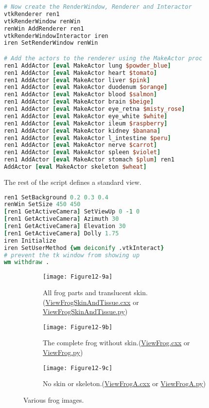 \begin{lstlisting}[language=TCL, caption={Create the actors.}]
# Now create the RenderWindow, Renderer and Interactor
vtkRenderer ren1
vtkRenderWindow renWin
renWin AddRenderer ren1
vtkRenderWindowInteractor iren
iren SetRenderWindow renWin

# Add the actors to the renderer using the MakeActor proc
ren1 AddActor [eval MakeActor lung $powder_blue]
ren1 AddActor [eval MakeActor heart $tomato]
ren1 AddActor [eval MakeActor liver $pink]
ren1 AddActor [eval MakeActor duodenum $orange]
ren1 AddActor [eval MakeActor blood $salmon]
ren1 AddActor [eval MakeActor brain $beige]
ren1 AddActor [eval MakeActor eye_retna $misty_rose]
ren1 AddActor [eval MakeActor eye_white $white]
ren1 AddActor [eval MakeActor ileum $raspberry]
ren1 AddActor [eval MakeActor kidney $banana]
ren1 AddActor [eval MakeActor l_intestine $peru]
ren1 AddActor [eval MakeActor nerve $carrot]
ren1 AddActor [eval MakeActor spleen $violet]
ren1 AddActor [eval MakeActor stomach $plum] ren1
AddActor [eval MakeActor skeleton $wheat]
\end{lstlisting}

The rest of the script defines a standard view.

\begin{lstlisting}[language=TCL, caption={Create the view.}]
ren1 SetBackground 0.2 0.3 0.4
renWin SetSize 450 450
[ren1 GetActiveCamera] SetViewUp 0 -1 0
[ren1 GetActiveCamera] Azimuth 30
[ren1 GetActiveCamera] Elevation 30
[ren1 GetActiveCamera] Dolly 1.75
iren Initialize
iren SetUserMethod {wm deiconify .vtkInteract}
# prevent the tk window from showing up
wm withdraw .
\end{lstlisting}

\begin{figure}[htb]
	\begin{subfigure}[h]{0.48\linewidth}
		\texttt{[image: Figure12-9a]}
		\caption{All frog parts and translucent skin.(\href{https://lorensen.github.io/VTKExamples/site/Cxx/Visualization/ViewFrogSkinAndTissue}{ViewFrogSkinAndTissue.cxx} or \href{https://lorensen.github.io/VTKExamples/site/Python/Visualization/ViewFrogSkinAndTissue/}{ViewFrogSkinAndTissue.py})}\label{fig:Figure12-9a}
	\end{subfigure}
	\hfill
	\begin{subfigure}[h]{0.48\linewidth}
		\texttt{[image: Figure12-9b]}
		\caption{The complete frog without skin.(\href{https://lorensen.github.io/VTKExamples/site/Cxx/Visualization/ViewFrog}{ViewFrog.cxx} or \href{https://lorensen.github.io/VTKExamples/site/Python/Visualization/ViewFrog/}{ViewFrog.py})}\label{fig:Figure12-9b}
	\end{subfigure}%
	\hfill
	\begin{subfigure}[h]{0.48\linewidth}
		\texttt{[image: Figure12-9c]}
		\caption{No skin or skeleton.(\href{https://lorensen.github.io/VTKExamples/site/Cxx/Visualization/ViewFrogA}{ViewFrogA.cxx} or \href{https://lorensen.github.io/VTKExamples/site/Python/Visualization/ViewFrogA/}{ViewFrogA.py})}\label{fig:Figure12-9c}
	\end{subfigure}
	\caption{Various frog images.}\label{fig:Figure12-9}
\end{figure}

